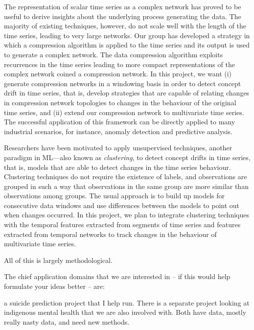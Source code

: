 \documentclass[10pt,a4paper]{Projects}
\begin{document}
The representation of scalar time series as a complex network has proved to be useful to derive insights about the underlying process generating the data. The majority of existing techniques, however, do not scale well with the length of the time series, leading to very large networks. Our group has developed a strategy in which a compression algorithm is applied to the time series and its output is used to generate a complex network. The data compression algorithm exploits recurrences in the time series leading to more compact representations of the complex network coined a compression network.  In this project, we want (i) generate compression networks in a windowing basis in order to detect concept drift in time series, that is, develop strategies that are capable of relating changes in compression network topologies to changes in the behaviour of the original time series, and (ii) extend our compression network to multivariate time series. The successful application of this framework can be directly applied to many industrial scenarios, for instance, anomaly detection and predictive analysis. 

Researchers have been motivated to apply unsupervised techniques, another paradigm in ML---also known as {\it clustering}, to detect concept drifts in time series, that is, models that are able to detect changes in the time series behaviour. Clustering techniques do not require the existence of labels, and observations are grouped in such a way that observations in the same group are more similar than observations among groups. The usual approach is to build up models for consecutive data windows and use differences between the models to point out when changes occurred. In this project, we plan to integrate clustering techniques with the temporal features extracted from segments of time series and features extracted from temporal networks to track changes in the behaviour of multivariate time series. 

All of this is largely methodological.
 
\newpage
{}
 
The chief application domains that we are interested in -- if this would help formulate your ideas better -- are:
 
a suicide prediction project that I help run. There is a separate project looking at indigenous mental health that we are also involved with. Both have data, mostly really nasty data, and need new methods. 
 
\end{document}
